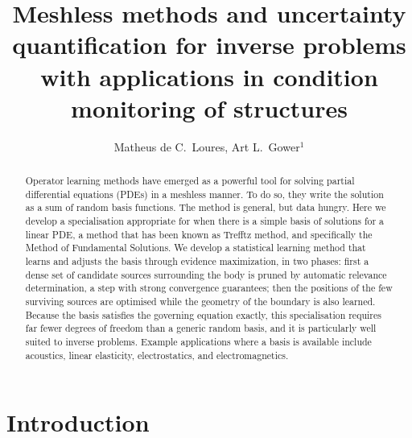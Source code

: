 \documentclass{article}
\title{Meshless methods and uncertainty quantification for inverse problems with applications in condition monitoring of structures}
\date{\vspace{-5ex}}
\author{ Matheus de C.\ Loures, Art L.\ Gower${}^1$}
\affil{Department of Mechanical, Aerospace and Civil Engineering, \\ The University of Sheffield, UK}
\begin{document}
\maketitle

\begin{abstract}
Operator learning methods have emerged as a powerful tool for solving partial differential equations (PDEs) in a meshless manner. To do so, they write the solution as a sum of random basis functions. The method is general, but data hungry. Here we develop a specialisation appropriate for when there is a simple basis of solutions for a linear PDE, a method that has been known as Trefftz method, and specifically the Method of Fundamental Solutions. We develop a statistical learning method that learns and adjusts the basis through evidence maximization, in two phases: first a dense set of candidate sources surrounding the body is pruned by automatic relevance determination, a step with strong convergence guarantees; then the positions of the few surviving sources are optimised while the geometry of the boundary is also learned. Because the basis satisfies the governing equation exactly, this specialisation requires far fewer degrees of freedom than a generic random basis, and it is particularly well suited to inverse problems. Example applications where a basis is available include acoustics, linear elasticity, electrostatics, and electromagnetics.
\end{abstract}

\section{Introduction}
\end{document}
